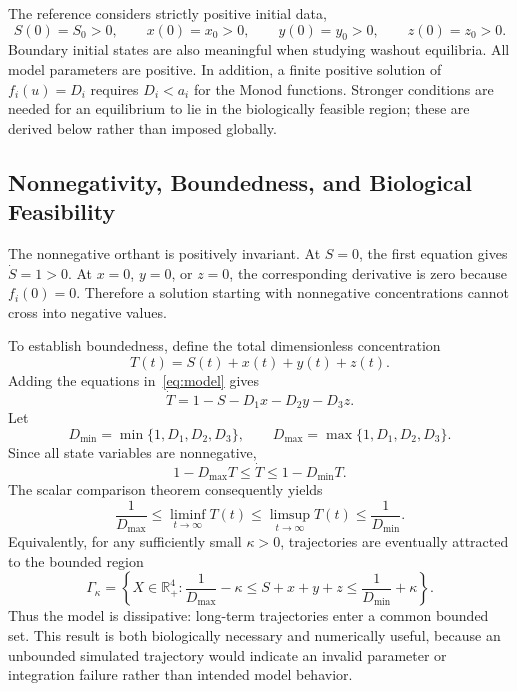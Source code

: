 The reference considers strictly positive initial data,
\begin{equation}
\label{eq:initial-condition}
S(0)=S_0>0,\qquad x(0)=x_0>0,\qquad
y(0)=y_0>0,\qquad z(0)=z_0>0.
\end{equation}
Boundary initial states are also meaningful when studying washout equilibria.
All model parameters are positive.  In addition, a finite positive solution
of \(f_i(u)=D_i\) requires \(D_i<a_i\) for the Monod functions.  Stronger
conditions are needed for an equilibrium to lie in the biologically feasible
region; these are derived below rather than imposed globally.

\subsection{Nonnegativity, Boundedness, and Biological Feasibility}

The nonnegative orthant is positively invariant.  At \(S=0\), the first
equation gives \(\dot S=1>0\).  At \(x=0\), \(y=0\), or \(z=0\), the
corresponding derivative is zero because \(f_i(0)=0\).  Therefore a solution
starting with nonnegative concentrations cannot cross into negative values.

To establish boundedness, define the total dimensionless concentration
\[
T(t)=S(t)+x(t)+y(t)+z(t).
\]
Adding the equations in~\eqref{eq:model} gives
\begin{equation}
\label{eq:total-biomass}
\dot T=1-S-D_1x-D_2y-D_3z.
\end{equation}
Let
\[
D_{\min}=\min\{1,D_1,D_2,D_3\},\qquad
D_{\max}=\max\{1,D_1,D_2,D_3\}.
\]
Since all state variables are nonnegative,
\begin{equation}
1-D_{\max}T\leq \dot T\leq 1-D_{\min}T.
\end{equation}
The scalar comparison theorem consequently yields
\begin{equation}
\frac{1}{D_{\max}}
\leq \liminf_{t\to\infty}T(t)
\leq \limsup_{t\to\infty}T(t)
\leq \frac{1}{D_{\min}}.
\end{equation}
Equivalently, for any sufficiently small \(\kappa>0\), trajectories are
eventually attracted to the bounded region
\begin{equation}
\label{eq:absorbing-region}
\Gamma_\kappa=
\left\{X\in\mathbb{R}_+^4:
\frac{1}{D_{\max}}-\kappa\leq S+x+y+z
\leq\frac{1}{D_{\min}}+\kappa\right\}.
\end{equation}
Thus the model is dissipative: long-term trajectories enter a common bounded
set.  This result is both biologically necessary and numerically useful,
because an unbounded simulated trajectory would indicate an invalid parameter
or integration failure rather than intended model behavior.

